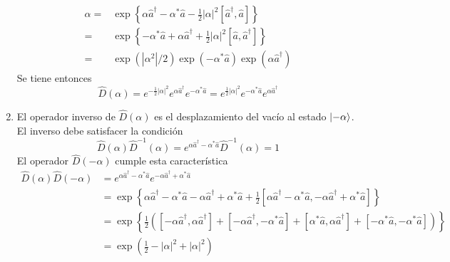 \begin{enumerate}
        \begin{align*}
          \displaystyle{\alpha} = & \exp \left\{ \alpha \hat{a}^{\dagger} - \alpha^{*} \hat{a} - \frac{1}{2}|\alpha|^2[\hat{a}^{\dagger},\hat{a}] \right\}    \\
          =                       & \exp \left\{ - \alpha^{*} \hat{a} + \alpha \hat{a}^{\dagger}  + \frac{1}{2}|\alpha|^2[\hat{a},\hat{a}^{\dagger}] \right\} \\
          =                       & \exp(|\alpha^2|/2)\exp(-\alpha^{*} \hat{a})\exp(\alpha\hat{a}^{\dagger})
        \end{align*}
        Se tiene entonces
        \begin{equation*}
          \hat{D}(\alpha)=e^{-\frac{1}{2}|\alpha|^2} e^{\alpha \hat{a}^\dagger} e^{-\alpha^* \hat{a}}  = e^{\frac{1}{2}|\alpha|^2} e^{-\alpha^* \hat{a}} e^{\alpha \hat{a}^\dagger}
        \end{equation*}
  \item El operador inverso de $\hat{D}(\alpha)$ es el desplazamiento del vacío al estado $\ket{-\alpha}$. El inverso debe satisfacer la condición
        \begin{equation*}
          \hat{D}(\alpha)\hat{D}^{-1}(\alpha) = e^{\alpha \hat{a}^{\dagger} - \alpha^{*}\hat{a}} \hat{D}^{-1}(\alpha) = 1
        \end{equation*}
        El operador $\hat{D}(-\alpha)$ cumple esta característica
        \begin{align*}
          \hat{D}(\alpha) \hat{D}(-\alpha) & = e^{\alpha \hat{a}^{\dagger} - \alpha^{*} \hat{a}} e^{-\alpha \hat{a}^{\dagger} + \alpha^{*} \hat{a}}                                                                                                                                                 \\
                                           & = \exp{\left\{ \alpha \hat{a}^{\dagger} - \alpha^{*} \hat{a} -\alpha \hat{a}^{\dagger} + \alpha^{*} \hat{a} + \frac{1}{2}[ \alpha \hat{a}^{\dagger} - \alpha^{*} \hat{a}, -\alpha \hat{a}^{\dagger} + \alpha^{*} \hat{a} ] \right\}}                   \\
                                           & = \exp{\left\{ \frac{1}{2}\left( [-\alpha \hat{a}^{\dagger}, \alpha\hat{a}^{\dagger}] + [-\alpha \hat{a}^{\dagger}, -\alpha^{*} \hat{a}] + [\alpha^{*} \hat{a}, \alpha\hat{a}^{\dagger}] + [-\alpha^{*} \hat{a}, -\alpha^{*}\hat{a}] \right) \right\}} \\
                                           & = \exp{(\frac{1}{2}-|\alpha|^2 + |\alpha|^2)}                                                                                                                                                                                                          \\

\end{align*}
\end{enumerate}

